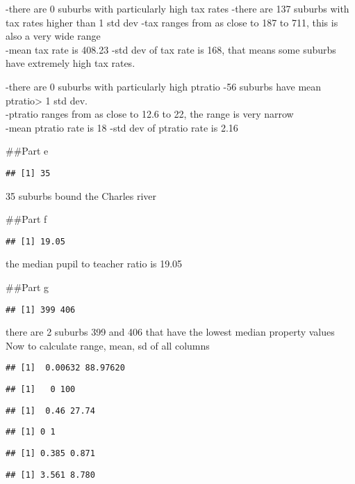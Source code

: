 \documentclass[
]{article}
\begin{document}
-there are 0 suburbs with particularly high tax rates -there are 137
suburbs with tax rates higher than 1 std dev -tax ranges from as close
to 187 to 711, this is also a very wide range\\
-mean tax rate is 408.23 -std dev of tax rate is 168, that means some
suburbs have extremely high tax rates.

-there are 0 suburbs with particularly high ptratio -56 suburbs have
mean ptratio\textgreater{} 1 std dev.\\
-ptratio ranges from as close to 12.6 to 22, the range is very narrow\\
-mean ptratio rate is 18 -std dev of ptratio rate is 2.16

\#\#Part e

\begin{verbatim}
## [1] 35
\end{verbatim}

35 suburbs bound the Charles river

\#\#Part f

\begin{verbatim}
## [1] 19.05
\end{verbatim}

the median pupil to teacher ratio is 19.05

\#\#Part g

\begin{verbatim}
## [1] 399 406
\end{verbatim}

there are 2 suburbs 399 and 406 that have the lowest median property
values Now to calculate range, mean, sd of all columns

\begin{verbatim}
## [1]  0.00632 88.97620
\end{verbatim}

\begin{verbatim}
## [1]   0 100
\end{verbatim}

\begin{verbatim}
## [1]  0.46 27.74
\end{verbatim}

\begin{verbatim}
## [1] 0 1
\end{verbatim}

\begin{verbatim}
## [1] 0.385 0.871
\end{verbatim}

\begin{verbatim}
## [1] 3.561 8.780
\end{verbatim}
\end{document}
